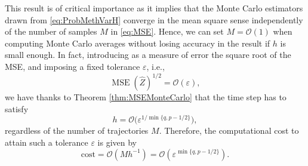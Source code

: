 \documentclass{siamart1116}
\numberwithin{theorem}{section}
\newcommand{\OO}{\mathcal{O}}
\newcommand{\epl}{\varepsilon}
\newcommand{\MSE}{\operatorname{MSE}}
\begin{document}
\begin{remark} This result is of critical importance as it implies that the Monte Carlo estimators drawn from \eqref{eq:ProbMethVarH} converge in the mean square sense independently of the number of samples $M$ in \eqref{eq:MSE}. Hence, we can set $M = \OO(1)$ when computing Monte Carlo averages without losing accuracy in the result if $h$ is small enough. In fact, introducing as a measure of error the square root of the MSE, and imposing a fixed tolerance $\epl$, i.e.,
\begin{equation}
	\MSE(\hat Z)^{1/2} = \OO(\epl),
\end{equation}
we have thanks to Theorem \ref{thm:MSEMonteCarlo} that the time step has to satisfy
\begin{equation}
	h = \OO\big(\epl^{1 / \min\{q, p - 1/2\}}\big),
\end{equation}
regardless of the number of trajectories $M$. Therefore, the computational cost to attain such a tolerance $\epl$ is given by
\begin{equation}
	\mathrm{cost} = \OO(Mh^{-1}) = \OO(\epl^{\min\{q, p - 1/2\}}).
\end{equation}
\end{remark} 
\end{document}
